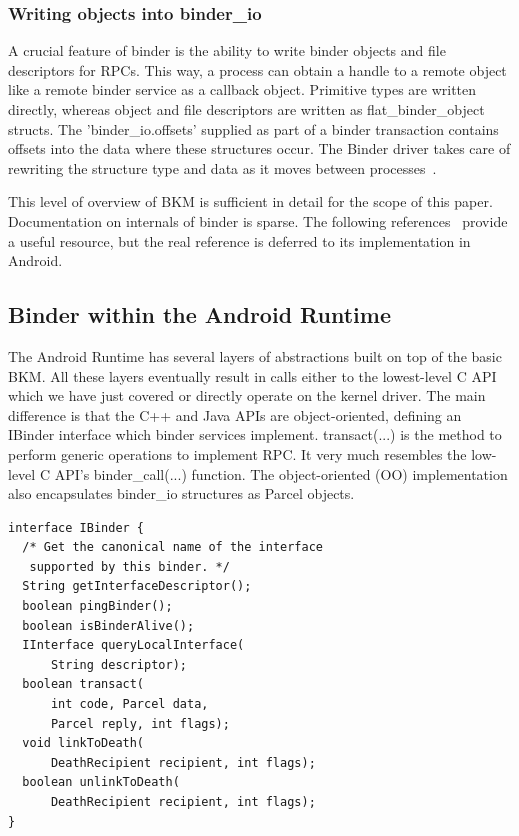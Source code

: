 \documentclass[prodmode]{acmlarge}
\begin{document}
\subsubsection{Writing objects into binder\_io}
A crucial feature of binder is the ability to write binder objects and file descriptors for RPCs. This way, a process can obtain a handle to a remote object like a remote binder service as a callback object. Primitive types are written directly, whereas object and file descriptors are written as flat\_binder\_object structs. The 'binder\_io.offsets' supplied as part of a binder transaction contains offsets into the data where these structures occur. The Binder driver takes care of rewriting the structure type and data as it moves between processes~\cite{BinderSourceComment}.

This level of overview of BKM is sufficient in detail for the scope of this paper. Documentation on internals of binder is sparse. The following references~\cite{BinderLinuxFoundation,BinderMastersThesis} provide a useful resource, but the real reference is deferred to its implementation in Android.

\subsection{Binder within the Android Runtime}
The Android Runtime has several layers of abstractions built on top of the basic BKM. All these layers eventually result in calls either to the lowest-level C API which we have just covered or directly operate on the kernel driver. The main difference is that the C++ and Java APIs are object-oriented, defining an IBinder interface which binder services implement. transact(...) is the method to perform generic operations to implement RPC. It very much resembles the low-level C API's binder\_call(...) function. The object-oriented (OO) implementation also encapsulates binder\_io structures as Parcel objects.

\begin{Verbatim}[samepage=true]
interface IBinder {
  /* Get the canonical name of the interface
   supported by this binder. */
  String getInterfaceDescriptor();
  boolean pingBinder();
  boolean isBinderAlive();
  IInterface queryLocalInterface(
      String descriptor);
  boolean transact(
      int code, Parcel data,
      Parcel reply, int flags);
  void linkToDeath(
      DeathRecipient recipient, int flags);
  boolean unlinkToDeath(
      DeathRecipient recipient, int flags);
}
\end{Verbatim}
\end{document}
